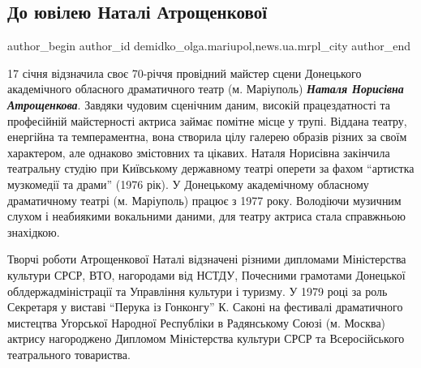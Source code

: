  
 
 
 
 
 
\subsection{До ювілею Наталі Атрощенкової}
\label{sec:18_01_2021.stz.news.ua.mrpl_city.1.jubilej_natalja_atroschenkova}
 
\ifcmt
 author_begin
   author_id demidko_olga.mariupol,news.ua.mrpl_city
 author_end
\fi


17 січня відзначила своє 70-річчя провідний майстер сцени Донецького
академічного обласного драматичного театр (м. Маріуполь) \emph{\textbf{Наталя Норисівна
Атрощенкова}}. Завдяки чудовим сценічним даним, високій працездатності та
професійній майстерності актриса займає помітне місце у трупі. Віддана театру,
енергійна та темпераментна, вона створила цілу галерею образів різних за своїм
характером, але однаково змістовних та цікавих. Наталя Норисівна закінчила
театральну студію при Київському державному театрі оперети за фахом \enquote{артистка
музкомедії та драми} (1976 рік). У Донецькому академічному обласному
драматичному театрі (м. Маріуполь) працює з 1977 року. Володіючи музичним
слухом і неабиякими вокальними даними, для театру актриса стала справжньою
знахідкою.

Творчі роботи Атрощенкової Наталі відзначені різними дипломами Міністерства
культури СРСР, ВТО, нагородами від НСТДУ, Почесними грамотами Донецької
облдержадміністрації та Управління культури і туризму. У 1979 році за роль
Секретаря у виставі \enquote{Перука із Гонконгу} К. Саконі на фестивалі драматичного
мистецтва Угорської Народної Республіки в Радянському Союзі (м. Москва) актрису
нагороджено Дипломом Міністерства культури СРСР та Всеросійського театрального
товариства.

